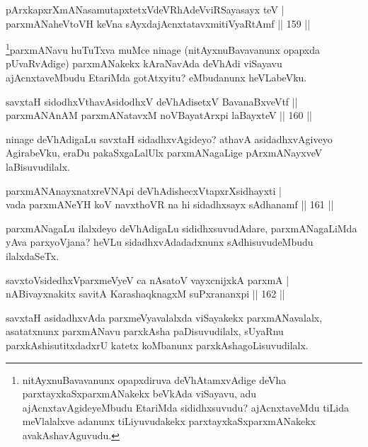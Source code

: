 
\begin{shl}
pArxkapxrXmANasamutapxtetxVdeVRhAdeVviRSayasayx teV | \\
parxmANaheVtoVH keVna sAyxdajAcnxtatavxmitiVyaRtAmf \hfill||  159 ||  
\end{shl}

\begin{artha}
\footnote[3]{nitAyxnuBavavanunx opapxdiruva deVhAtamxvAdige deVha parxtayxkaSxparxmANakekx beVkAda viSayavu, adu ajAcnxtavAgideyeMbudu EtariMda sididhxsuvudu? ajAcnxtaveMdu tiLida meVlalalxve adanunx tiLiyuvudakekx parxtayxkaSxparxmANakekx avakAshavAguvudu.}parxmANavu huTuTxva muMce ninage (nitAyxnuBavavanunx opapxda pUvaRvAdige) parxmANakekx kAraNavAda deVhAdi viSayavu ajAcnxtaveMbudu EtariMda gotAtxyitu? eMbudanunx heVLabeVku.
\end{artha}

\begin{shl}
savxtaH sidodhxV\s thavA\s sidodhxV deVhAdisetxV BavanaBxveVtf ||  \\
parxmANAnAM parxmANatavxM noVBayatArxpi laBayxteV \hfill||  160 ||  
\end{shl}

\begin{artha}
ninage deVhAdigaLu savxtaH sidadhxvAgideyo? athavA asidadhxvAgiveyo AgirabeVku, eraDu pakaSxgaLalUlx parxmANagaLige pArxmANayxveV laBisuvudilalx.
\end{artha}

\begin{shl}
parxmANAnayxnatxreVNApi deVhAdishecxVtapxrXsidhayxti | \\
vada parxmANeYH koV navxthoVR na hi sidadhxsayx sAdhanamf \hfill||  161 ||  
\end{shl}

\begin{artha}
parxmANagaLu ilalxdeyo deVhAdigaLu sididhxsuvudAdare, parxmANagaLiMda yAva parxyoVjana? heVLu sidadhxvAdadadxnunx sAdhisuvudeMbudu ilalxdaSeTx.
\end{artha}

\begin{shl}
savxtoV\s sidedhxV\s parxmeVyeV ca nAsatoV vayxcnijxkA parxmA | \\
nABivayxnakitx savitA KarashaqknagxM suPxrananxpi \hfill||  162 ||  
\end{shl}

\begin{artha}
savxtaH asidadhxvAda parxmeVyavalalxda viSayakekx parxmANavalalx, asatatxnunx parxmANavu parxkAsha paDisuvudilalx, sUyaRnu parxkAshisutitxdadxrU katetx koMbanunx parxkAshagoLisuvudilalx.
\end{artha}

